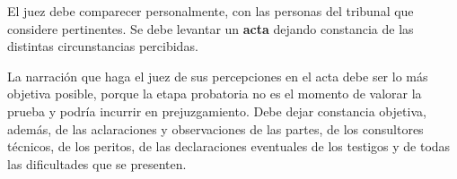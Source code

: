 \documentclass[12pt,oneside]{book}
\begin{document}
El juez debe comparecer personalmente, con las personas del tribunal que considere pertinentes. Se debe levantar un \textbf{acta} dejando constancia de las distintas circunstancias percibidas.

\begin{important}
La narración que haga el juez de sus percepciones en el acta debe ser lo más objetiva posible, porque la etapa probatoria no es el momento de valorar la prueba y podría incurrir en prejuzgamiento. Debe dejar constancia objetiva, además, de las aclaraciones y observaciones de las partes, de los consultores técnicos, de los peritos, de las declaraciones eventuales de los testigos y de todas las dificultades que se presenten.
\end{important}
\end{document}
